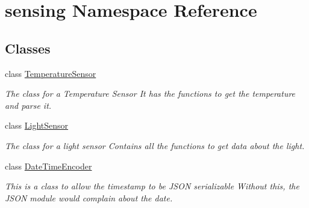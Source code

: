 \hypertarget{namespacesensing}{\section{sensing Namespace Reference}
\label{namespacesensing}
}
\subsection*{Classes}
\begin{DoxyCompactItemize}
\item 
class \hyperlink{classsensing_1_1_temperature_sensor}{Temperature\-Sensor}
\begin{DoxyCompactList}\small\item\em The class for a Temperature Sensor It has the functions to get the temperature and parse it. \end{DoxyCompactList}\item 
class \hyperlink{classsensing_1_1_light_sensor}{Light\-Sensor}
\begin{DoxyCompactList}\small\item\em The class for a light sensor Contains all the functions to get data about the light. \end{DoxyCompactList}\item 
class \hyperlink{classsensing_1_1_date_time_encoder}{Date\-Time\-Encoder}
\begin{DoxyCompactList}\small\item\em This is a class to allow the timestamp to be J\-S\-O\-N serializable Without this, the J\-S\-O\-N module would complain about the date. \end{DoxyCompactList}\end{DoxyCompactItemize}
